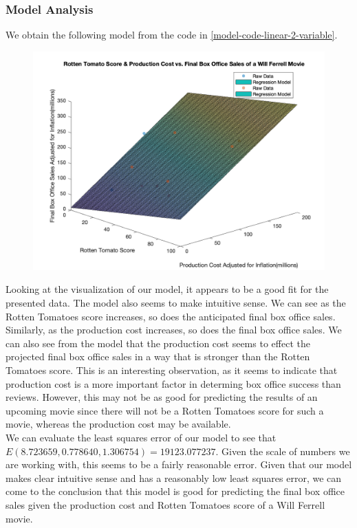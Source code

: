 \documentclass[11pt]{article}
\begin{document}
\subsubsection{Model Analysis}
We obtain the following model from the code in \ref{model-code-linear-2-variable}.
\label{two-variable-linear-plot}
\begin{figure}[H]
    \centering 
    \includegraphics[width=\textwidth]{models/c-2.png}
\end{figure}
Looking at the visualization of our model, it appears to be a good fit for the presented data.  
The model also seems to make intuitive sense.  
We can see as the Rotten Tomatoes score increases, so does the anticipated final box office sales.  
Similarly, as the production cost increases, so does the final box office sales.
We can also see from the model that the production cost seems to effect the projected final box office sales in a way that is stronger than the Rotten Tomatoes score.  
This is an interesting observation, as it seems to indicate that production cost is a more important factor in determing box office success than reviews. 
However, this may not be as good for predicting the results of an upcoming movie since there will not be a Rotten Tomatoes score for such a movie, whereas the production cost may be available. 
\\

We can evaluate the least squares error of our model to see that $E(8.723659,0.778640,1.306754) = 19123.077237$.  Given the scale of numbers we are working with, this seems to be a fairly reasonable error.  Given that our model makes clear intuitive sense and has a reasonably low least squares error, we can come to the conclusion that this model is good for predicting the final box office sales given the production cost and Rotten Tomatoes score of a Will Ferrell movie.
\end{document}

